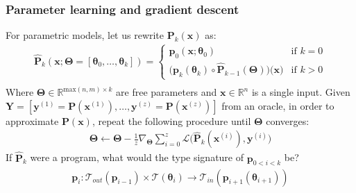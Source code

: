 \documentclass{beamer}
\begin{document}
    \begin{frame}
        \frametitle{Parameter learning and gradient descent}
        For parametric models, let us rewrite $\mathbf{P}_k(\mathbf{x})$ as:
        \begin{align*}
            \mathbf{\hat P}_k(\mathbf{x}; \mathbf{\boldsymbol\Theta} = [\boldsymbol\theta_0, \dots, \boldsymbol\theta_k]) = \begin{cases} \mathbf{p}_0(\mathbf{x}; \boldsymbol\theta_0) &\text{if } k=0\\ \big(\mathbf{p}_k(\boldsymbol\theta_k)\circ \mathbf{\hat P}_{k-1}(\boldsymbol\Theta)\big)\big(\mathbf{x}\big)&\text{if } k > 0 \end{cases} \\
        \end{align*}
        Where $\boldsymbol\Theta \in \mathbb{R}^{\text{max}(n, m) \times k}$ are free parameters and $\mathbf{x} \in \mathbb{R}^n$ is a single input. Given $\mathbf{Y} = [\mathbf{y}^{(1)} = \mathbf{P}(\mathbf{x}^{(1)}), \dots, \mathbf{y}^{(z)} = \mathbf{P}(\mathbf{x}^{(z)})]$ from an oracle, in order to approximate $\mathbf{P}(\mathbf x)$, repeat the following procedure until $\boldsymbol\Theta$ converges:
        \begin{align*}
            \boldsymbol\Theta \leftarrow \boldsymbol\Theta - \frac{1}{z}\nabla_{\boldsymbol\Theta} \sum_{i=0}^z\mathcal{L}\big(\mathbf{\hat P}_k(\mathbf{x}^{(i)}), \mathbf{y}^{(i)}\big)
        \end{align*}
        If $\mathbf{\hat P}_{k}$ were a program, what would the type signature of $\mathbf{p}_{0<i<k}$ be?
        \begin{align*}
            \mathbf{p}_i: \mathcal{T}_{out}(\mathbf{p}_{i-1}) \times \mathcal{T}(\boldsymbol\theta_{i}) \rightarrow \mathcal{T}_{in}(\mathbf{p}_{i+1}(\boldsymbol\theta_{i+1}))
        \end{align*}
    \end{frame}

\end{document}
